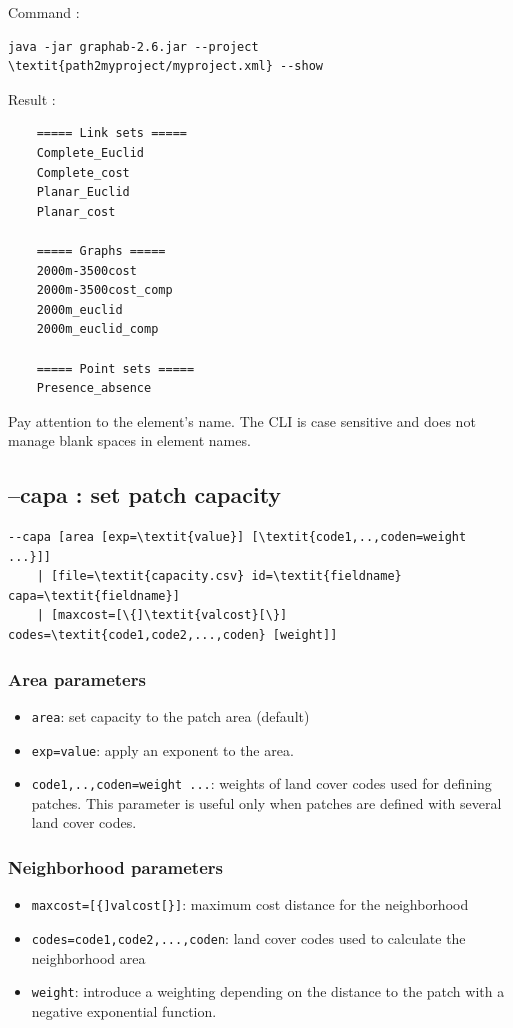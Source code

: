 \documentclass[a4paper,10pt]{report}
\begin{document}
Command :
\begin{Verbatim}[commandchars=\\\{\}]
java -jar graphab-2.6.jar --project \textit{path2myproject/myproject.xml} --show
\end{Verbatim}
Result :
\begin{Verbatim}
	===== Link sets =====
	Complete_Euclid
	Complete_cost
	Planar_Euclid
	Planar_cost
	
	===== Graphs =====
	2000m-3500cost
	2000m-3500cost_comp
	2000m_euclid
	2000m_euclid_comp
	
	===== Point sets =====
	Presence_absence
\end{Verbatim}
Pay attention to the element's name. The CLI is case sensitive and does not manage blank spaces in element names.

\subsection{--capa : set patch capacity}
\begin{Verbatim}[commandchars=\\\{\}]
--capa [area [exp=\textit{value}] [\textit{code1,..,coden=weight ...}]] 
	| [file=\textit{capacity.csv} id=\textit{fieldname} capa=\textit{fieldname}]
	| [maxcost=[\{]\textit{valcost}[\}] codes=\textit{code1,code2,...,coden} [weight]]
\end{Verbatim}

\subsubsection{Area parameters}
\begin{itemize}
	\item \verb|area|: set capacity to the patch area (default)
	\item \verb|exp=value|: apply an exponent to the area.
	\item \verb|code1,..,coden=weight ...|: weights of land cover codes used for defining patches. This parameter is useful only when patches are defined with several land cover codes.
\end{itemize}

\subsubsection{Neighborhood parameters}
\begin{itemize}
	\item \verb|maxcost=[{]valcost[}]|: maximum cost distance for the neighborhood
	\item \verb|codes=code1,code2,...,coden|: land cover codes used to calculate the neighborhood area
	\item \verb|weight|: introduce a weighting depending on the distance to the patch with a negative exponential function.
\end{itemize}
\end{document}
